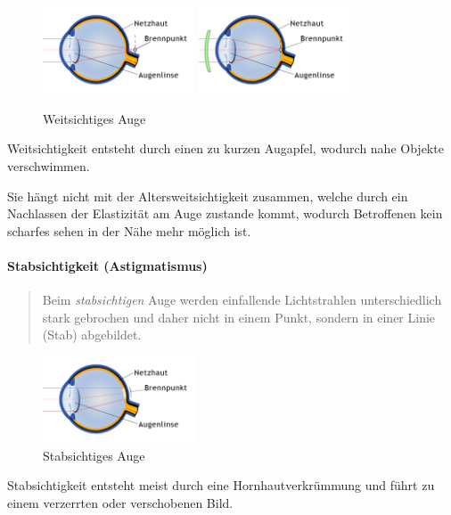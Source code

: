 \begin{figure}
	\centering
	\includegraphics[width=4.5cm]{images/weitsichtig.png}
	\hspace{1cm}
	\includegraphics[width=4.5cm]{images/weitsichtig_korrigiert.png}
	\caption{Weitsichtiges Auge \cite{abadi:fehlsichtigkeit}}
\end{figure}

Weitsichtigkeit entsteht durch einen zu kurzen Augapfel, wodurch nahe Objekte verschwimmen.

Sie hängt nicht mit der Altersweitsichtigkeit zusammen, welche durch ein Nachlassen der Elastizität am Auge zustande kommt, wodurch Betroffenen kein scharfes sehen in der Nähe mehr möglich ist.

\newpage
\paragraph{Stabsichtigkeit (Astigmatismus)}
\begin{quote}
Beim \textit{stabsichtigen} Auge werden einfallende Lichtstrahlen unterschiedlich stark gebrochen und daher nicht in einem Punkt, sondern in einer Linie (Stab) abgebildet.
\end{quote}

\begin{figure}
	\centering
	\includegraphics[width=4.5cm]{images/stabsichtig.png}
	\caption{Stabsichtiges Auge \cite{abadi:fehlsichtigkeit}}
\end{figure}

Stabsichtigkeit entsteht meist durch eine Hornhautverkrümmung und führt zu einem verzerrten oder verschobenen Bild.
